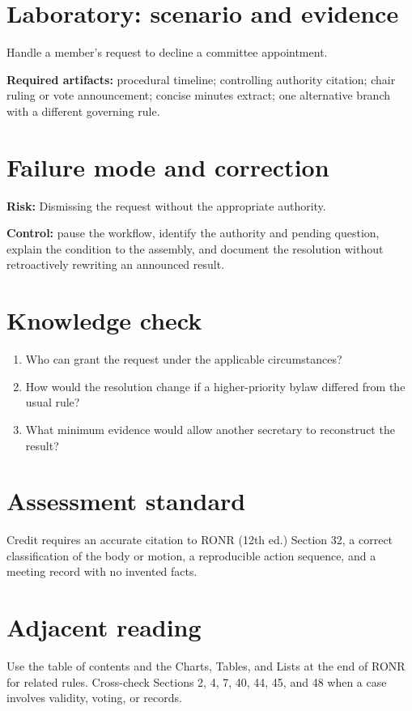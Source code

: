 \documentclass[11pt]{article}
\begin{document}
\section{Laboratory: scenario and evidence}
Handle a member’s request to decline a committee appointment.

\textbf{Required artifacts:} procedural timeline; controlling authority citation; chair ruling or vote announcement; concise minutes extract; one alternative branch with a different governing rule.

\section{Failure mode and correction}
\textbf{Risk:} Dismissing the request without the appropriate authority.

\textbf{Control:} pause the workflow, identify the authority and pending question, explain the condition to the assembly, and document the resolution without retroactively rewriting an announced result.

\section{Knowledge check}
\begin{enumerate}[leftmargin=*,itemsep=4pt]
\item Who can grant the request under the applicable circumstances?
\item How would the resolution change if a higher-priority bylaw differed from the usual rule?
\item What minimum evidence would allow another secretary to reconstruct the result?
\end{enumerate}

\section{Assessment standard}
Credit requires an accurate citation to RONR (12th ed.) Section 32, a correct classification of the body or motion, a reproducible action sequence, and a meeting record with no invented facts.

\section{Adjacent reading}
Use the table of contents and the Charts, Tables, and Lists at the end of RONR for related rules. Cross-check Sections 2, 4, 7, 40, 44, 45, and 48 when a case involves validity, voting, or records.
\end{document}
